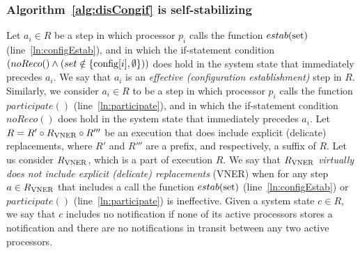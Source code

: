 \documentclass[11pt]{article}
\newcommand{\noReconfig}{noReco}
\newcommand{\configEstab}{estab}
\begin{document}
\subsubsection*{Algorithm~\ref{alg:disCongif} is self-stabilizing}
Let $a_i \in R$ be a step in which processor $p_i$ calls the function $\configEstab(\textnormal{set})$ (line~\ref{ln:configEstab}), and in which the if-statement condition $(\noReconfig() \land (set \notin \{ \textnormal{config}[i], \emptyset \} ))$ does hold in the system state that immediately precedes $a_i$. We say that $a_i$ is an \emph{effective  (configuration establishment)} step in $R$. Similarly, we consider $a_i \in R$ to be a step in which processor $p_i$ calls the function $participate()$ (line~\ref{ln:participate}), and in which the if-statement condition $\noReconfig()$ does hold in the system state that immediately precedes $a_i$.
Let $R = R' \circ R_{\textnormal{VNER}} \circ R'''$ be an execution that does include explicit (delicate) replacements, where $R'$ and $R'''$ are a prefix, and respectively, a suffix of $R$. Let us consider $R_{\textnormal{VNER}}$, which is a part of execution $R$. We say that $R_{\textnormal{VNER}}$ \emph{virtually does not include explicit (delicate) replacements} (VNER) when for any step $a \in R_{\textnormal{VNER}}$ that includes a call the function $\configEstab(\textnormal{set})$ (line~\ref{ln:configEstab}) or $participate()$ (line~\ref{ln:participate}) is ineffective. Given a system state $c \in R$, we say that $c$ includes no notification if none of its active processors stores a notification and there are no notifications in transit between any two active processors. 
\end{document}
